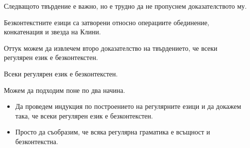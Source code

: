 Следващото твърдение е важно, но е трудно да не пропуснем доказателството му.
\begin{important}
  \begin{proposition}
    Безконтекстните езици са затворени относно операциите обединение, конкатенация и звезда на Клини.
  \end{proposition}
\end{important}

Оттук можем да извлечем второ доказателство на твърдението, че всеки регулярен език е безконтекстен.

\begin{proposition}
  Всеки регулярен език е безконтекстен.
\end{proposition}
\begin{hint}
  Можем да подходим поне по два начина.
  \begin{itemize}
  \item
    Да проведем индукция по построението на регулярните езици и да докажем така, че всеки регулярен език е безконтекстен.
  \item
    Просто да съобразим, че всяка регулярна граматика е всъщност и безконтекстна.
  \end{itemize} 
\end{hint}



